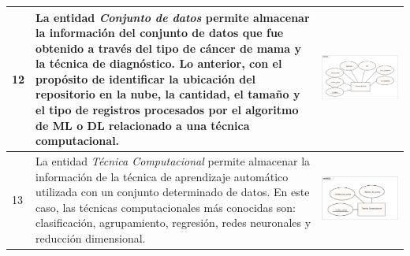 \begin{table}[htb!]
	\footnotesize
	\begin{threeparttable}
		\begin{tabular}{p{0.5cm} p{7cm} p{7cm}} \toprule 
			12
			& La entidad \textit{Conjunto de datos} permite almacenar la información del conjunto de datos que fue obtenido a través del tipo de cáncer de mama y la técnica de diagnóstico. Lo anterior, con el propósito de identificar la ubicación del repositorio en la nube, la cantidad, el tamaño y el tipo de registros procesados por el algoritmo de ML o DL relacionado a una técnica computacional. 
			
			& \begin{center}\includegraphics[width=1\linewidth]{MER/IMAGENES_MER/12_CONJUNTO_DATOS}\end{center}
			\\ \hline
			13
			& La entidad \textit{Técnica Computacional} permite almacenar la información de la técnica de aprendizaje automático utilizada con un conjunto determinado de datos. En este caso, las técnicas computacionales más conocidas son: clasificación, agrupamiento, regresión, redes neuronales y reducción dimensional. 
			& \begin{center}\includegraphics[width=1\linewidth]{MER/IMAGENES_MER/13_TECNICA_COMPUTACIONAL}\end{center}

\end{tabular}
\end{threeparttable}
\end{table}
